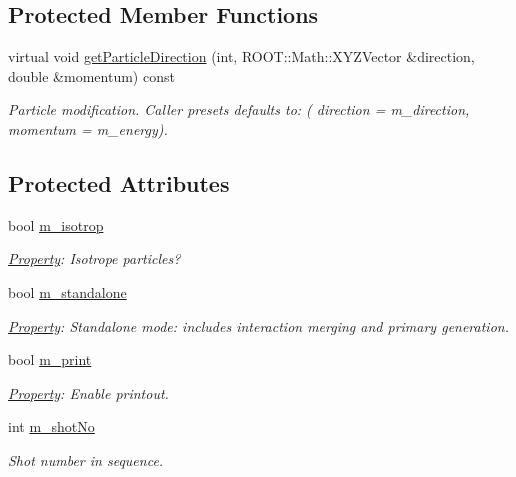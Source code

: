 \subsection*{Protected Member Functions}
\begin{DoxyCompactItemize}
\item 
virtual void \hyperlink{class_d_d4hep_1_1_simulation_1_1_geant4_particle_gun_a38c98b33bbe2f7064bce8c9f4345f262}{getParticleDirection} (int, ROOT::Math::XYZVector \&direction, double \&momentum) const 
\begin{DoxyCompactList}\small\item\em Particle modification. Caller presets defaults to: ( direction = m\_\-direction, momentum = m\_\-energy). \item\end{DoxyCompactList}\end{DoxyCompactItemize}
\subsection*{Protected Attributes}
\begin{DoxyCompactItemize}
\item 
bool \hyperlink{class_d_d4hep_1_1_simulation_1_1_geant4_particle_gun_aba05dc63eaf9a7f7d06932d9f66eb154}{m\_\-isotrop}
\begin{DoxyCompactList}\small\item\em \hyperlink{class_d_d4hep_1_1_property}{Property}: Isotrope particles? \item\end{DoxyCompactList}\item 
bool \hyperlink{class_d_d4hep_1_1_simulation_1_1_geant4_particle_gun_af845ef9f13542031af0bf41b53a9f462}{m\_\-standalone}
\begin{DoxyCompactList}\small\item\em \hyperlink{class_d_d4hep_1_1_property}{Property}: Standalone mode: includes interaction merging and primary generation. \item\end{DoxyCompactList}\item 
bool \hyperlink{class_d_d4hep_1_1_simulation_1_1_geant4_particle_gun_ac7ffd1d0ae00fc56978aef5cf7ec6b83}{m\_\-print}
\begin{DoxyCompactList}\small\item\em \hyperlink{class_d_d4hep_1_1_property}{Property}: Enable printout. \item\end{DoxyCompactList}\item 
int \hyperlink{class_d_d4hep_1_1_simulation_1_1_geant4_particle_gun_a385166af11357b6ec06b835b4ee8cca6}{m\_\-shotNo}
\begin{DoxyCompactList}\small\item\em Shot number in sequence. \item\end{DoxyCompactList}\end{DoxyCompactItemize}


